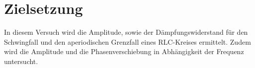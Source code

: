 \section{Zielsetzung}
\label{sec:Zielsetzung}

In diesem Versuch wird die Amplitude, sowie der Dämpfungswiderstand für den Schwingfall und den
aperiodischen Grenzfall eines RLC-Kreises ermittelt. Zudem wird die Amplitude und die Phasenverschiebung in Abhängigkeit der
Frequenz untersucht.
